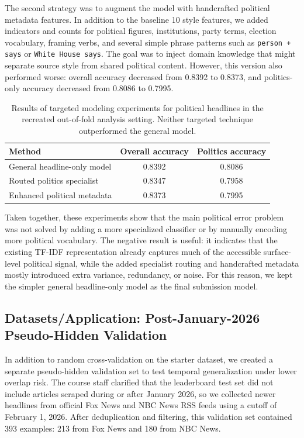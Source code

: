 \documentclass[10pt]{article}
\begin{document}
The second strategy was to augment the model with handcrafted political metadata features. In addition to the baseline 10 style features, we added indicators and counts for political figures, institutions, party terms, election vocabulary, framing verbs, and several simple phrase patterns such as \texttt{person + says} or \texttt{White House says}. The goal was to inject domain knowledge that might separate source style from shared political content. However, this version also performed worse: overall accuracy decreased from 0.8392 to 0.8373, and politics-only accuracy decreased from 0.8086 to 0.7995.

\begin{table}[h]
\centering
\small
\begin{tabular}{lcc}
\hline
Method & Overall accuracy & Politics accuracy \\
\hline
General headline-only model & 0.8392 & 0.8086 \\
Routed politics specialist & 0.8347 & 0.7958 \\
Enhanced political metadata & 0.8373 & 0.7995 \\
\hline
\end{tabular}
\caption{Results of targeted modeling experiments for political headlines in the recreated out-of-fold analysis setting. Neither targeted technique outperformed the general model.}
\label{tab:politics-technique-results}
\end{table}

Taken together, these experiments show that the main political error problem was not solved by adding a more specialized classifier or by manually encoding more political vocabulary. The negative result is useful: it indicates that the existing TF-IDF representation already captures much of the accessible surface-level political signal, while the added specialist routing and handcrafted metadata mostly introduced extra variance, redundancy, or noise. For this reason, we kept the simpler general headline-only model as the final submission model.

\subsection{Datasets/Application: Post-January-2026 Pseudo-Hidden Validation}
In addition to random cross-validation on the starter dataset, we created a separate pseudo-hidden validation set to test temporal generalization under lower overlap risk. The course staff clarified that the leaderboard test set did not include articles scraped during or after January 2026, so we collected newer headlines from official Fox News and NBC News RSS feeds using a cutoff of February 1, 2026. After deduplication and filtering, this validation set contained 393 examples: 213 from Fox News and 180 from NBC News.
\end{document}
